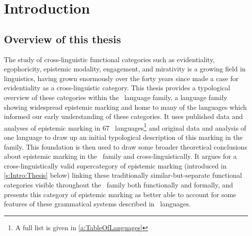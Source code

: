 \chapter{Introduction}\label{c:Introduction}
\section{Overview of this thesis}
The study of cross-linguistic functional categories such as evidentiality, egophoricity, epistemic modality, engagement, and mirativity is a growing field in linguistics, having grown enormously over the forty years since  made a case for evidentiality as a cross-linguistic category. This thesis provides a typological overview of these categories within the \lfam\ language family, a language family showing widespread epistemic marking and home to many of the languages which informed our early understanding of these categories. It uses published data and analyses of epistemic marking in 67 \lfam\ languages\footnote{A full list is given in \ref{a:TableOfLanguages}} and original data and analysis of one language to draw up an initial typological description of this marking in the family. This foundation is then used to draw some broader theoretical conclusions about epistemic marking in the \lfam\ family and cross-linguistically. It argues for a cross-linguistically valid supercategory of epistemic marking (introduced in \ref{s:Intro:Thesis} below) linking these traditionally similar-but-separate functional categories visible throughout the \lfam\ family both functionally and formally, and presents this category of epistemic marking as better able to account for some features of these grammatical systems described in \lfam\ languages.

